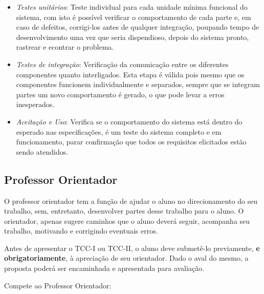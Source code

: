 \begin{itemize}
	\item \emph{Testes unitários}: Teste individual para cada unidade mínima funcional do sistema, com isto é possível verificar o comportamento de cada parte e, em caso de defeitos, corrigi-los antes de qualquer integração, poupando tempo de desenvolvimento uma vez que seria dispendioso, depois do sistema pronto, rastrear e econtrar o problema.
	\item \emph{Testes de integração}: Verificação da comunicação entre os diferentes componentes quanto interligados. Esta etapa é válida pois mesmo que os componentes funcionem individualmente e separados, sempre que se integram partes um novo comportamento é gerado, o que pode levar a erros inesperados.
	\item \emph{Aceitação e Uso}: Verifica se o comportamento do sistema está dentro do esperado nas especificações, é um teste do sistema completo e em funcionamento, parar confirmação que todos os requisitos elicitados estão sendo atendidos.
\end{itemize}



\subsection{Professor Orientador}

O professor orientador tem a função de ajudar o aluno no direcionamento do seu trabalho, sem, entretanto, desenvolver partes desse 
trabalho para o aluno. O orientador, apenas sugere caminhos que o aluno deverá seguir, acompanha seu trabalho, motivando e corrigindo eventuais erros.

Antes de apresentar o TCC-I ou TCC-II, o aluno deve submetê-lo previamente, \textbf{e obrigatoriamente}, à apreciação de seu orientador. 
Dado o aval do mesmo, a proposta poderá ser encaminhada e apresentada para avaliação.

Compete ao Professor Orientador:

